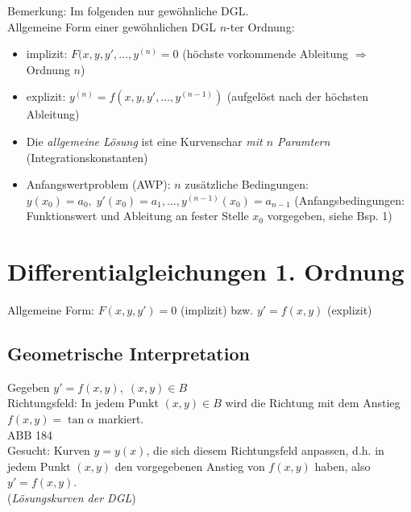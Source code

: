 Bemerkung: Im folgenden nur gewöhnliche DGL.\medskip\\
Allgemeine Form einer gewöhnlichen DGL $n$-ter Ordnung:
\begin{itemize}
\item implizit: $F(x,y,y',\dots,y^{(n)}=0$ (höchste vorkommende Ableitung $\Rightarrow$ Ordnung $n$)
\item explizit: $y^{(n)}=f(x,y,y',\dots,y^{(n-1)})$ (aufgelöst nach der höchsten Ableitung)
\end{itemize}
\begin{itemize}
\item Die \emph{allgemeine Lösung} ist eine Kurvenschar \emph{mit $n$ Paramtern} (Integrationskonstanten)
\item Anfangswertproblem (AWP): $n$ zusätzliche Bedingungen: \\
$y(x_0)=a_0, \; y'(x_0)=a_1, \dots, y^{(n-1)}(x_0)=a_{n-1}$ (Anfangsbedingungen: Funktionswert und Ableitung an fester Stelle $x_0$ vorgegeben, siehe Bsp. 1)
\end{itemize}
\section{Differentialgleichungen 1. Ordnung}
Allgemeine Form: $F(x,y,y')=0$ (implizit) bzw. $y'=f(x,y)$ (explizit)
\subsection{Geometrische Interpretation}
Gegeben $y'=f(x,y), \; (x,y) \in B$\\
Richtungsfeld: In jedem Punkt $(x,y)\in B$ wird die Richtung mit dem Anstieg $f(x,y)=\tan \alpha$ markiert.\\
ABB 184\\
Gesucht: Kurven $y=y(x)$, die sich diesem Richtungsfeld anpassen, d.h. in jedem Punkt $(x,y)$ den vorgegebenen Anstieg von $f(x,y)$ haben, also $y'=f(x,y)$.\\
(\emph{Lösungskurven der DGL})

